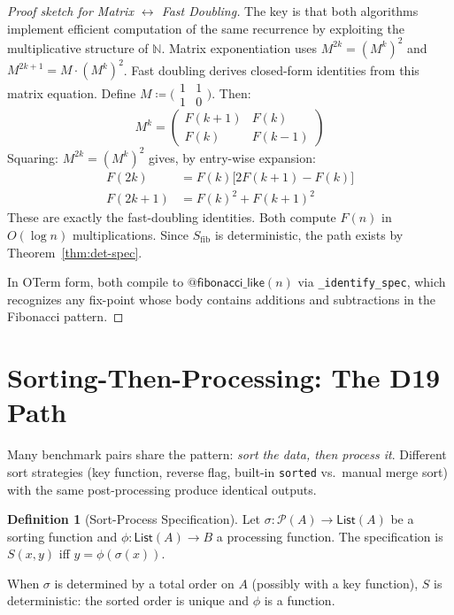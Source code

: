 \documentclass[11pt,a4paper]{report}
\theoremstyle{definition}
\newtheorem{definition}{Definition}[chapter]
\theoremstyle{plain}
\newcommand{\Nat}{\mathbb{N}}
\begin{document}
\begin{proof}[Proof sketch for Matrix $\leftrightarrow$ Fast Doubling]
The key is that both algorithms implement efficient computation of
the same recurrence by exploiting the multiplicative structure of
$\Nat$.  Matrix exponentiation uses
$M^{2k} = (M^k)^2$ and $M^{2k+1} = M \cdot (M^k)^2$.
Fast doubling derives closed-form identities from this matrix
equation.  Define $M \coloneqq
\bigl(\begin{smallmatrix}1&1\\1&0\end{smallmatrix}\bigr)$.
Then:
\[
  M^k = \begin{pmatrix} F(k{+}1) & F(k) \\ F(k) & F(k{-}1)
  \end{pmatrix}
\]
Squaring: $M^{2k} = (M^k)^2$ gives, by entry-wise expansion:
\begin{align*}
  F(2k) &= F(k)\bigl[2F(k{+}1) - F(k)\bigr] \\
  F(2k{+}1) &= F(k)^2 + F(k{+}1)^2
\end{align*}
These are exactly the fast-doubling identities.  Both compute
$F(n)$ in $O(\log n)$ multiplications.  Since $S_{\mathrm{fib}}$
is deterministic, the path exists by Theorem~\ref{thm:det-spec}.

In OTerm form, both compile to $\mathsf{@fibonacci\_like}(n)$ via
\texttt{\_identify\_spec}, which recognizes any fix-point whose
body contains additions and subtractions in the Fibonacci pattern.
\end{proof}

\section{Sorting-Then-Processing: The D19 Path}
\label{sec:sort-process}

Many benchmark pairs share the pattern: \emph{sort the data, then
process it}.  Different sort strategies (key function, reverse flag,
built-in \texttt{sorted} vs.\ manual merge sort) with the same
post-processing produce identical outputs.

\begin{definition}[Sort-Process Specification]
Let $\sigma : \mathcal{P}(A) \to \mathsf{List}(A)$ be a sorting
function and $\phi : \mathsf{List}(A) \to B$ a processing function.
The specification is $S(x, y)$ iff $y = \phi(\sigma(x))$.

When $\sigma$ is determined by a total order on $A$ (possibly
with a key function), $S$ is deterministic: the sorted order is
unique and $\phi$ is a function.
\end{definition}
\end{document}
